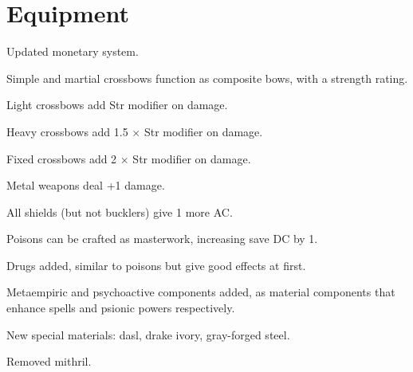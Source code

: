 \section{Equipment}
\begin{itemize*}
	\item Updated monetary system.
	\item Simple and martial crossbows function as composite bows, with a strength rating.
	\begin{itemize*}
		\item Light crossbows add Str modifier on damage.
		\item Heavy crossbows add 1.5 $\times$ Str modifier on damage.
		\item Fixed crossbows add 2 $\times$ Str modifier on damage.
	\end{itemize*}
	\item Metal weapons deal +1 damage.
	\item All shields (but not bucklers) give 1 more AC.
	\item Poisons can be crafted as masterwork, increasing save DC by 1.
	\item Drugs added, similar to poisons but give good effects at first.
	\item Metaempiric and psychoactive components added, as material components that enhance spells and psionic powers respectively.
	\item New special materials: dasl, drake ivory, gray-forged steel.
	\item Removed mithril.
\end{itemize*}

